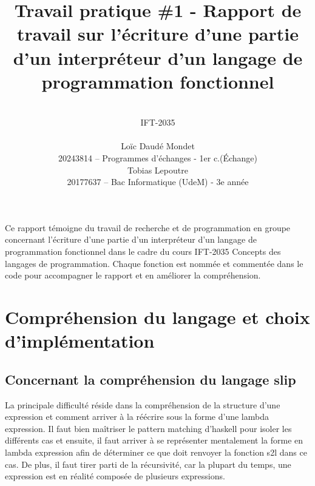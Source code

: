 \documentclass{article}
\title{Travail pratique \#1 - Rapport de travail sur l'écriture d'une partie d’un interpréteur d’un langage de programmation fonctionnel}
\author{
\\IFT-2035
\\\
\\Loïc Daudé Mondet
\\20243814 -- Programmes d'échanges - 1er c.(Échange)
\\Tobias Lepoutre
\\20177637 -- Bac Informatique (UdeM) - 3e année
}
\renewenvironment{abstract}
	{\center{\bfseries Contexte\vspace{-\topsep}}\endcenter\quotation}
	{\endquotation}
\begin{document}
\maketitle

\newcommand \mML {\ensuremath\mu\textsl{ML}}
\newcommand \kw [1] {\textsf{#1}}
\newcommand \id [1] {\textsl{#1}}
\newcommand \punc [1] {\kw{`#1'}}
\newcommand \str [1] {\texttt{"#1"}}
\newenvironment{outitemize}{
	\begin{itemize}
		\let \origitem \item \def \item {\origitem[]\hspace{-18pt}}
		}{
	\end{itemize}
}
\newcommand \Align [2][t] {
	\begin{array}[#1]{@{}l}
		#2 
	\end{array}}

\begin{abstract}
	Ce rapport témoigne du travail de recherche et de programmation en groupe concernant l'écriture d'une partie d’un interpréteur d’un langage de programmation fonctionnel dans le cadre du cours IFT-2035 Concepts des langages de programmation. Chaque fonction est nommée et commentée dans le code pour accompagner le rapport et en améliorer la compréhension.
\end{abstract}

\section{Compréhension du langage et choix d'implémentation}
\subsection{Concernant la compréhension du langage slip}
La principale difficulté réside dans la compréhension de la structure d'une expression et comment arriver à la réécrire sous la forme d'une lambda expression. Il faut bien maîtriser le pattern matching d'haskell pour isoler les différents cas et ensuite, il faut arriver à se représenter mentalement la forme en lambda expression afin de déterminer ce que doit renvoyer la fonction s2l dans ce cas. De plus, il faut tirer parti de la récursivité, car la plupart du temps, une expression est en réalité composée de plusieurs expressions.
\end{document}
